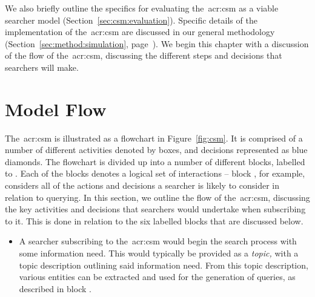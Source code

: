 We also briefly outline the specifics for evaluating the~\gls{acr:csm} as a viable searcher model (Section~\ref{sec:csm:evaluation}). Specific details of the implementation of the~\gls{acr:csm} are discussed in our general methodology (Section~\ref{sec:method:simulation}, page~\pageref{sec:method:simulation}). We begin this chapter with a discussion of the flow of the~\gls{acr:csm}, discussing the different steps and decisions that searchers will make.

\section{Model Flow}\label{sec:csm:flow}
The~\gls{acr:csm} is illustrated as a flowchart in Figure~\ref{fig:csm}. It is comprised of a number of different activities denoted by boxes, and decisions represented as blue diamonds. The flowchart is divided up into a number of different blocks, labelled  to . Each of the blocks denotes a logical set of interactions -- block , for example, considers all of the actions and decisions a searcher is likely to consider in relation to querying. In this section, we outline the flow of the~\gls{acr:csm}, discussing the key activities and decisions that searchers would undertake when subscribing to it. This is done in relation to the six labelled blocks that are discussed below.

\begin{itemize}
    
    \item[\blueboxbold{A}]{ A searcher subscribing to the~\gls{acr:csm} would begin the search process with some information need. This would typically be provided as a \emph{topic,} with a topic description outlining said information need. From this topic description, various entities can be extracted and used for the generation of queries, as described in block .}

\end{itemize}

